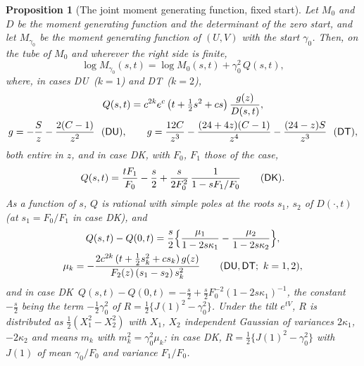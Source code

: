 \documentclass[ecta,nameyear,final]{econsocart}
\newcommand{\Fk}{\textsf{\upshape DK}}
\newcommand{\Fu}{\textsf{\upshape DU}}
\newcommand{\Ft}{\textsf{\upshape DT}}
\theoremstyle{plain}
\newtheorem{proposition}{Proposition}
\theoremstyle{definition}
\begin{document}
\begin{proposition}[The joint moment generating function, fixed start]
\label{prop:fixed}
Let $M_0$ and $D$ be the moment generating function and the determinant of the zero start, and let $M_{\gamma_0}$ be the moment generating function of $(U,V)$ with the start $\gamma_0$.  Then, on the tube of $M_0$ and wherever the right side is finite,
\begin{equation}
\log M_{\gamma_0}(s,t)=\log M_0(s,t)+\gamma_0^2\,Q(s,t),
\label{eq:fixedstart}
\end{equation}
where, in cases \Fu\ ($k=1$) and \Ft\ ($k=2$),
\begin{equation}
\begin{gathered}
Q(s,t)=c^{2k}e^c\,\big(t+\tfrac12s^2+cs\big)\,\frac{g(z)}{D(s,t)},\\
g=-\frac{S}{z}-\frac{2(C-1)}{z^2}\ \ (\Fu),\qquad
g=\frac{12C}{z^3}-\frac{(24+4z)(C-1)}{z^4}-\frac{(24-z)S}{z^3}\ \ (\Ft),
\end{gathered}
\label{eq:g}
\end{equation}
both entire in $z$, and in case \Fk, with $F_0$, $F_1$ those of the case,
\begin{equation}
Q(s,t)=\frac{tF_1}{F_0}-\frac{s}{2}+\frac{s}{2F_0^2}\,\frac{1}{1-sF_1/F_0}\qquad(\Fk).
\label{eq:QK}
\end{equation}
As a function of $s$, $Q$ is rational with simple poles at the roots $s_1$, $s_2$ of $D(\cdot,t)$ (at $s_1=F_0/F_1$ in case \Fk), and
\begin{equation}
\begin{gathered}
Q(s,t)-Q(0,t)=\frac{s}{2}\Big\{\frac{\mu_1}{1-2s\kappa_1}-\frac{\mu_2}{1-2s\kappa_2}\Big\},\\
\mu_k=-\frac{2c^{2k}\,(t+\tfrac12s_k^2+cs_k)\,g(z)}{F_2(z)\,(s_1-s_2)\,s_k^2}\qquad(\Fu,\Ft;\ k=1,2),
\end{gathered}
\label{eq:partial}
\end{equation}
and in case \Fk\ $Q(s,t)-Q(0,t)=-\frac s2+\frac s2F_0^{-2}(1-2s\kappa_1)^{-1}$, the constant $-\frac s2$ being the term $-\frac12\gamma_0^2$ of $R=\frac12\{J(1)^2-\gamma_0^2\}$.  Under the tilt $e^{tV}$, $R$ is distributed as $\frac12(X_1^2-X_2^2)$ with $X_1$, $X_2$ independent Gaussian of variances $2\kappa_1$, $-2\kappa_2$ and means $m_k$ with $m_k^2=\gamma_0^2\mu_k$; in case \Fk, $R=\frac12\{J(1)^2-\gamma_0^2\}$ with $J(1)$ of mean $\gamma_0/F_0$ and variance $F_1/F_0$.
\end{proposition}
\end{document}

